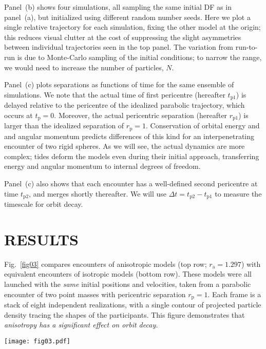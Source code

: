 \documentclass[fleqn,usenatbib]{mnras}
\begin{document}
Panel~(b) shows four simulations, all sampling the same initial DF as in panel~(a), but initialized using different random number seeds. Here we plot a single relative trajectory for each simulation, fixing the other model at the origin; this reduces visual clutter at the cost of suppressing the slight asymmetries between individual trajectories seen in the top panel. The variation from run-to-run is due to Monte-Carlo sampling of the initial conditions; to narrow the range, we would need to increase the number of particles, $N$.

Panel~(c) plots separations as functions of time for the same ensemble of simulations. We note that the actual time of first pericentre (hereafter $t_\mathrm{p1}$) is delayed relative to the pericentre of the idealized parabolic trajectory, which occurs at $t_\mathrm{p} = 0$. Moreover, the actual pericentric separation (hereafter $r_\mathrm{p1}$) is larger than the idealized separation of $r_\mathrm{p} = 1$. Conservation of orbital energy and and angular momentum predicts differences of this kind for an interpenetrating encounter of two rigid spheres. As we will see, the actual dynamics are more complex; tides deform the models even during their initial approach, transferring energy and angular momentum to internal degrees of freedom. 

Panel~(c) also shows that each encounter has a well-defined second pericentre at time $t_\mathrm{p2}$, and merges shortly thereafter. We will use $\Delta t = t_\mathrm{p2} - t_\mathrm{p1}$ to measure the timescale for orbit decay.

\section{RESULTS}
\label{sec:results}

Fig.~\ref{fig03} compares encounters of anisotropic models (top row; $r_\mathrm{a} = 1.297$) with equivalent encounters of isotropic models (bottom row). These models were all launched with the \textit{same} initial positions and velocities, taken from a parabolic encounter of two point masses with pericentric separation $r_\mathrm{p} = 1$. Each frame is a stack of eight independent realizations, with a single contour of projected particle density tracing the shapes of the participants. This figure demonstrates that \textit{anisotropy has a significant effect on orbit decay.}

\begin{figure*}
    \centering
    \texttt{[image: fig03.pdf]}
    \caption{Encounters between anisotropic models (top; $r_\mathrm{a} = 1.297$) and isotropic models (bottom). In both cases, the galaxies were launched on parabolic orbits with $r_\mathrm{p} = 1$. Each image is $32$ length units on a side, and shows a stack of eight realizations. A single contour is included to show the tidal distortion. The anisotropic models fall back together much more rapidly, as the later panels show.}
    \label{fig03}
\end{figure*}
\end{document}
